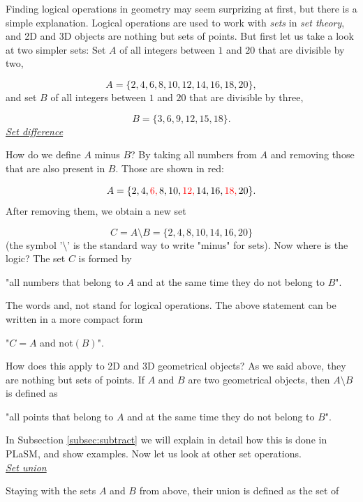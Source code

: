 Finding logical operations in geometry may seem surprizing at first, but there 
is a simple explanation. Logical operations are used to 
work with {\em sets} in {\em set theory}, and 2D and 3D objects are nothing 
but sets of points. But first let us take a look at two simpler sets: 
Set $A$ of all integers between $1$ and $20$ that are divisible by two,

$$
A = \{2, 4, 6, 8, 10, 12, 14, 16, 18, 20\},
$$
and set $B$ of all integers between $1$ and $20$ that are divisible by three,

$$
B = \{3, 6, 9, 12, 15, 18\}.
$$
\underline{\em Set difference}

How do we define $A$ minus $B$? By taking all numbers from $A$ 
and removing those that are also present in $B$. Those are shown in red: 

$$
A = \{2, 4, {\color{red}6,} \,8, 10, {\color{red}12,} \,14, 16, {\color{red}18,} \,20\}.
$$
After removing them, we obtain a new set

$$
C = A \setminus B = \{2, 4, 8, 10, 14, 16, 20\}
$$
(the symbol '$\setminus$' is the standard way to write "minus" for sets).
Now where is the logic? The set $C$ is formed by \\

\centerline{
"all numbers that belong to $A$ {\color{red}and} at the same time they do {\color{red}not} belong to $B$".
}
\vspace{4mm}
\noindent
The words {\color{red}and}, {\color{red}not} stand for logical operations. 
The above statement can be written in a more compact form \\

\centerline{
"$C = A$ {\color{red}and} {\color{red}not}$(B)$".
}
\vspace{4mm}
\noindent
How does this apply to 2D and 3D geometrical objects? As we said above,
they are nothing but sets of points. If $A$ and $B$ are two geometrical objects,
then $A \setminus B$ is defined as\\

\centerline{
"all points that belong to $A$ {\color{red}and} at the same time they do {\color{red}not} belong to $B$".
}
\vspace{4mm}
\noindent
In Subsection \ref{subsec:subtract} we will explain in detail how this is done 
in PLaSM, and show examples. Now let us look at other set operations.\\

\noindent
\underline{\em Set union}

Staying with the sets $A$ and $B$ from above, their union is defined 
as the set of \\

